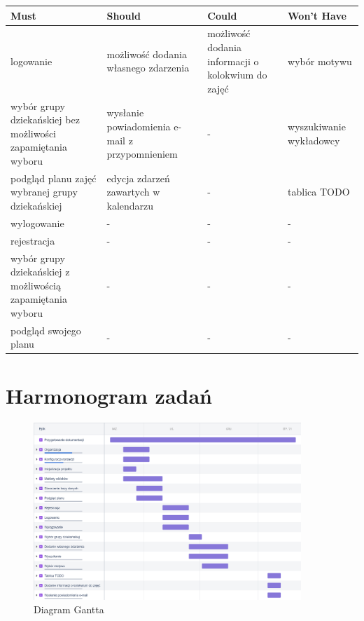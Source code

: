 \documentclass[a4paper,11pt]{uzreport}
\begin{document}
\begin{center}
\begin{tabular}{ |m{4cm} | m{4cm} |m{4cm} | m{4cm} | } 
\hline
\textbf{Must} & \textbf{Should} & \textbf{Could} & \textbf{Won’t Have}\\
\hline
logowanie 	& możliwość dodania własnego zdarzenia & możliwość dodania informacji o kolokwium do zajęć & wybór motywu\\ 
\hline
wybór grupy dziekańskiej bez możliwości zapamiętania wyboru	& wysłanie powiadomienia e-mail z przypomnieniem & - & wyszukiwanie wykładowcy\\ 
\hline
podgląd planu zajęć wybranej grupy dziekańskiej 				& edycja zdarzeń zawartych w kalendarzu & - & tablica TODO\\ 
\hline
wylogowanie 										& - & - & -\\ 
\hline
rejestracja	& - & - & -\\ 
\hline
wybór grupy dziekańskiej z możliwością zapamiętania wyboru	& - & - & -\\ 
\hline
podgląd swojego planu 								& - & - & -\\ 
\hline
\end{tabular}
\end{center}

\section{Harmonogram zadań}
    
    \begin{figure}[ht!]
	\vspace{-15pt}
        \centering
        \includegraphics[width=0.9\textwidth]{pictures/fabulous_uz_planner_2020-10-27_06.13pm.png}
        \caption{Diagram Gantta}
	\vspace{-30pt}
     \end{figure}
\end{document}
